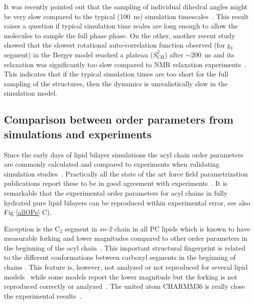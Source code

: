 \documentclass[aps,prl,superscriptaddress,twocolumn]{revtex4}
\begin{document}
It was recently pointed out that the sampling of individual dihedral angles might be very
slow compared to the typical (100~ns) simulation timescales~\cite{vogel12}.
This result raises a question if typical simulation time scales are long enough to allow
the molecules to sample the full phase phase. On the other, another recent study showed
that the slowest rotational auto-correlation function observed (for g$_1$ segment) 
in the Berger model reached a plateau ($S_\mathrm{CH}^2$) after $\sim$200~ns
and its relaxation was significantly too slow compared to NMR relaxation experiments~\cite{ferreira15}. 
This indicates that if the typical simulation times are too short for the full sampling
of the structures, then the dynamics is unrealistically slow in the simulation model.


\subsection{Comparison between order parameters from simulations and experiments}

Since the early days of lipid bilayer simulations the acyl chain order parameters are commonly calculated and compared to experiments
when validating simulation studies~\cite{ploeg82,egberts88,stouch93,egberts94,essex94,robinson94,hyvonen95,kothekar96,tieleman96,shinoda97,berger97,tieleman97,klauda08b}. 
Practically all the state of the art force field parametrization publications report these
to be in good agreement with experiments~\cite{berger97,hogberg08,poger10,ulmschneider09,kukol09,chiu09,klauda10,dickson12,jambeck12,chowdhary13,maciejewski14,tjornhammar14,dickson14,lee14}.
It is remarkable that the experimental order parameters for acyl chains in fully hydrated pure lipid bilayers
can be reproduced within experimental error, see also Fig \ref{allOPs} C). 

Exception is the C$_2$ segment in {\it sn-2} chain in all PC lipids which is known
to have measurable forking and lower magnitudes compared to other order parameters in 
the beginning of the acyl chain~\cite{??}. This important structural fingerprint is
related to the different conformations between carboxyl segments in the beginning of chains \cite{??}.
This feature is, however, not analyzed or not reproduced for several lipid models~\cite{hogberg08,chiu09,kukol09,ulmschneider09,jambeck12,dickson12,chowdhary13,tjornhammar14,maciejewski14}
while some models report the lower magnitude but the forking is not reproduced correctly or analyzed~\cite{klauda10,chowdhary13,dickson14}.
The united atom CHARMM36 is really close the experimental results~\cite{lee14}.
\end{document}
